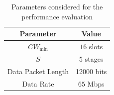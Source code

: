 \documentclass[conference]{IEEEtran}
\begin{document}
\begin{table}[h!!!]
\centering
\begin{tabular}{c|c}
Parameter & Value \\
\hline
$CW_{\min}$ & $16$ slots \\
$S$ & 5 stages\\
Data Packet Length & 12000 bits \\
Data Rate & $65$ Mbps\\
\hline
\end{tabular}

\caption{Parameters considered for the performance evaluation}\label{Tbl:parameters}

\end{table}


\end{document}
